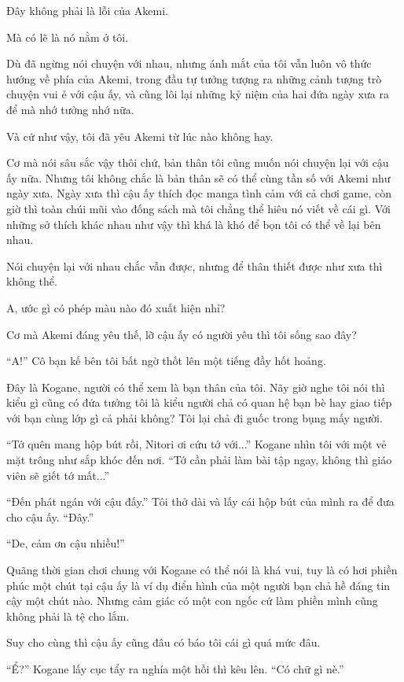 {Đây không phải là lỗi của Akemi.

Mà có lẽ là nó nằm ở tôi.

Dù đã ngừng nói chuyện với nhau, nhưng ánh mắt của tôi vẫn luôn vô thức
hướng về phía của Akemi, trong đầu tự tưởng tượng ra những cảnh tượng
trò chuyện vui ẻ với cậu ấy, và cũng lôi lại những kỷ niệm của hai đứa
ngày xưa ra để mà nhớ tưởng nhớ nữa.

Và cứ như vậy, tôi đã yêu Akemi từ lúc nào không hay.

Cơ mà nói sâu sắc vậy thôi chứ, bản thân tôi cũng muốn nói chuyện lại
với cậu ấy nữa. Nhưng tôi không chắc là bản thân sẽ có thể cùng tần số
với Akemi như ngày xưa. Ngày xưa thì cậu ấy thích đọc manga tình cảm với
cả chơi game, còn giờ thì toàn chúi mũi vào đống sách mà tôi chẳng thể
hiêu nó viết về cái gì. Với những sở thích khác nhau như vậy thì khá là
khó để bọn tôi có thể về lại bên nhau.

Nói chuyện lại với nhau chắc vẫn được, nhưng để thân thiết được như xưa
thì không thể.

A, ước gì có phép màu nào đó xuất hiện nhỉ?

Cơ mà Akemi đáng yêu thế, lỡ cậu ấy có người yêu thì tôi sống sao đây?

``A!'' Cô bạn kế bên tôi bất ngờ thốt lên một tiếng đầy hốt hoảng.

Đây là Kogane, người có thể xem là bạn thân của tôi. Nãy giờ nghe tôi
nói thì kiểu gì cũng có đứa tưởng tôi là kiểu người chả có quan hệ bạn
bè hay giao tiếp với bạn cùng lớp gì cả phải không? Tôi lại chả đi guốc
trong bụng mấy người.

``Tớ quên mang hộp bút rồi, Nitori ơi cứu tớ với...'' Kogane nhìn tôi
với một vẻ mặt trông như sắp khóc đến nơi. ``Tớ cần phải làm bài tập
ngay, không thì giáo viên sẽ giết tớ mất...''

``Đến phát ngán với cậu đấy.'' Tôi thở dài và lấy cái hộp bút của mình
ra để đưa cho cậu ấy. ``Đây.''

``De, cảm ơn cậu nhiều!''

Quãng thời gian chơi chung với Kogane có thể nói là khá vui, tuy là có
hơi phiền phúc một chút tại cậu ấy là ví dụ điển hình của một người bạn
chả hề đáng tin cậy một chút nào. Nhưng cảm giác có một con ngốc cứ làm
phiền mình cũng không phải là tệ cho lắm.

Suy cho cùng thì cậu ấy cũng đâu có báo tôi cái gì quá mức đâu.

``Ể?'' Kogane lấy cục tẩy ra nghía một hồi thì kêu lên. ``Có chữ gì
nè.''

}
